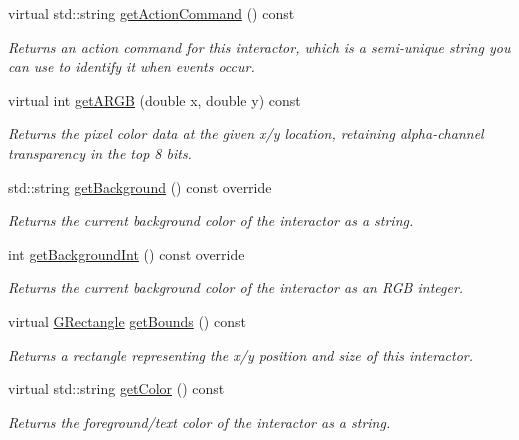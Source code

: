 \begin{DoxyCompactItemize}
virtual std\+::string \mbox{\hyperlink{classGInteractor_a94eb4276000c4fdfb508ce9e6317a82a}{get\+Action\+Command}} () const
\begin{DoxyCompactList}\small\item\em Returns an action command for this interactor, which is a semi-\/unique string you can use to identify it when events occur. \end{DoxyCompactList}\item 
virtual int \mbox{\hyperlink{classGDrawingSurface_ae394d39f20476570e083918d991c25bd}{get\+A\+R\+GB}} (double x, double y) const
\begin{DoxyCompactList}\small\item\em Returns the pixel color data at the given x/y location, retaining alpha-\/channel transparency in the top 8 bits. \end{DoxyCompactList}\item 
std\+::string \mbox{\hyperlink{classGCanvas_a4a62c51b7244a7642b88065e3a07ae82}{get\+Background}} () const override
\begin{DoxyCompactList}\small\item\em Returns the current background color of the interactor as a string. \end{DoxyCompactList}\item 
int \mbox{\hyperlink{classGCanvas_acd4f2b3b9619dacdfd71fc0004cac382}{get\+Background\+Int}} () const override
\begin{DoxyCompactList}\small\item\em Returns the current background color of the interactor as an R\+GB integer. \end{DoxyCompactList}\item 
virtual \mbox{\hyperlink{structGRectangle}{G\+Rectangle}} \mbox{\hyperlink{classGInteractor_a29e6ac35a0b48f491a4c88194cc5da3b}{get\+Bounds}} () const
\begin{DoxyCompactList}\small\item\em Returns a rectangle representing the x/y position and size of this interactor. \end{DoxyCompactList}\item 
virtual std\+::string \mbox{\hyperlink{classGInteractor_aa061dfa488c31e18549d64363c1d0e34}{get\+Color}} () const
\begin{DoxyCompactList}\small\item\em Returns the foreground/text color of the interactor as a string. \end{DoxyCompactList}\item 

\end{DoxyCompactItemize}
